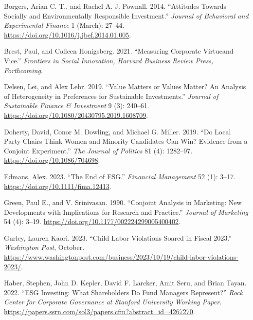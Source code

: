 \documentclass[
  12pt,
]{article}
\newlength{\cslhangindent}
\newlength{\cslentryspacingunit} %
\newenvironment{CSLReferences}[2] %
 {%
  \setlength{\parindent}{0pt}
  \ifodd #1
  \let\oldpar\par
  \def\par{\hangindent=\cslhangindent\oldpar}
  \fi
  \setlength{\parskip}{#2\cslentryspacingunit}
 }%
 {}
\begin{document}
\begin{CSLReferences}{1}{0}
\leavevmode{}%
Borgers, Arian C. T., and Rachel A. J. Pownall. 2014. {``Attitudes Towards Socially and Environmentally Responsible Investment.''} \emph{Journal of Behavioral and Experimental Finance} 1 (March): 27--44. \url{https://doi.org/10.1016/j.jbef.2014.01.005}.

\leavevmode{}%
Brest, Paul, and Colleen Honigsberg. 2021. {``Measuring Corporate Virtue{\textemdash}and Vice.''} \emph{Frontiers in Social Innovation, Harvard Business Review Press, Forthcoming}.

\leavevmode{}%
Delsen, Lei, and Alex Lehr. 2019. {``Value Matters or Values Matter? An Analysis of Heterogeneity in Preferences for Sustainable Investments.''} \emph{Journal of Sustainable Finance \& Investment} 9 (3): 240--61. \url{https://doi.org/10.1080/20430795.2019.1608709}.

\leavevmode{}%
Doherty, David, Conor M. Dowling, and Michael G. Miller. 2019. {``Do Local Party Chairs Think Women and Minority Candidates Can Win? Evidence from a Conjoint Experiment.''} \emph{The Journal of Politics} 81 (4): 1282--97. \url{https://doi.org/10.1086/704698}.

\leavevmode{}%
Edmans, Alex. 2023. {``The End of ESG.''} \emph{Financial Management} 52 (1): 3--17. \url{https://doi.org/10.1111/fima.12413}.

\leavevmode{}%
Green, Paul E., and V. Srinivasan. 1990. {``Conjoint Analysis in Marketing: New Developments with Implications for Research and Practice.''} \emph{Journal of Marketing} 54 (4): 3--19. \url{https://doi.org/10.1177/002224299005400402}.

\leavevmode{}%
Gurley, Lauren Kaori. 2023. {``Child Labor Violations Soared in Fiscal 2023.''} \emph{Washington Post}, October. \url{https://www.washingtonpost.com/business/2023/10/19/child-labor-violations-2023/}.

\leavevmode{}%
Haber, Stephen, John D. Kepler, David F. Larcker, Amit Seru, and Brian Tayan. 2022. {``ESG Investing: What Shareholders Do Fund Managers Represent?''} \emph{Rock Center for Corporate Governance at Stanford University Working Paper}. \url{https://papers.ssrn.com/sol3/papers.cfm?abstract_id=4267270}.


\end{CSLReferences}
\end{document}
